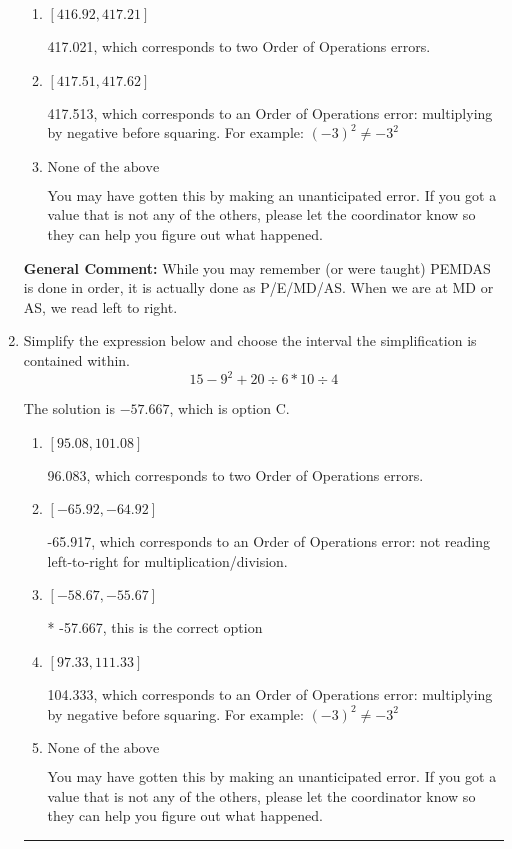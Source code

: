 \documentclass{extbook}[14pt]
\newcommand{\litem}[1]{\item #1

\rule{\textwidth}{0.4pt}}
\begin{document}
\begin{enumerate}
{\begin{enumerate}[label=\Alph*.]
 -382.979, which corresponds to an Order of Operations error: not reading left-to-right for multiplication/division.
\item \( [416.92, 417.21] \)

 417.021, which corresponds to two Order of Operations errors.
\item \( [417.51, 417.62] \)

 417.513, which corresponds to an Order of Operations error: multiplying by negative before squaring. For example: $(-3)^2 \neq -3^2$
\item \( \text{None of the above} \)

 You may have gotten this by making an unanticipated error. If you got a value that is not any of the others, please let the coordinator know so they can help you figure out what happened.
\end{enumerate}

\textbf{General Comment:} While you may remember (or were taught) PEMDAS is done in order, it is actually done as P/E/MD/AS. When we are at MD or AS, we read left to right.
}
\litem{
Simplify the expression below and choose the interval the simplification is contained within.
\[ 15 - 9^2 + 20 \div 6 * 10 \div 4 \]

The solution is \( -57.667 \), which is option C.\begin{enumerate}[label=\Alph*.]
\item \( [95.08, 101.08] \)

 96.083, which corresponds to two Order of Operations errors.
\item \( [-65.92, -64.92] \)

 -65.917, which corresponds to an Order of Operations error: not reading left-to-right for multiplication/division.
\item \( [-58.67, -55.67] \)

* -57.667, this is the correct option
\item \( [97.33, 111.33] \)

 104.333, which corresponds to an Order of Operations error: multiplying by negative before squaring. For example: $(-3)^2 \neq -3^2$
\item \( \text{None of the above} \)

 You may have gotten this by making an unanticipated error. If you got a value that is not any of the others, please let the coordinator know so they can help you figure out what happened.
\end{enumerate}

}
\end{enumerate}
\end{document}
